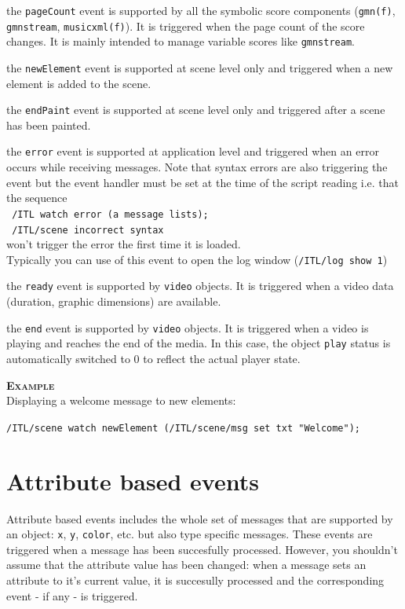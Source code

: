 \documentclass[a4paper,twoside]{report}
\newcommand{\sublevel}[1]	{\section{#1}}
\newcommand{\OSC}[1]		{\texttt{#1}}
\newcommand{\example}		{\textbf{\hspace{-1.5cm}\textbf{\textsc{Example }}}}
\let\olditemize\itemize
\let\oldenditemize\enditemize
\renewenvironment{itemize} 	{\olditemize \setlength{\itemsep}{1mm}}{\oldenditemize}
\newcommand{\sample}	[1]			{\vspace{-2mm}\begin{center}\colorbox{mygrey}{
								\begin{minipage}[t]{0.9\columnwidth} 
								{\small \texttt{#1}}
								\end{minipage}}\end{center}}
\begin{document}
\begin{itemize}
\item the \OSC{pageCount} event is supported by all the symbolic score components (\OSC{gmn(f)}, \OSC{gmnstream}, \OSC{musicxml(f)}). It is triggered when the page count of the score changes. It is mainly intended to manage variable scores like \OSC{gmnstream}.
\item the \OSC{newElement} event is supported at scene level only and triggered when a new element is added to the scene.
\item the \OSC{endPaint} event is supported at scene level only and triggered after a scene has been painted.
\item the \OSC{error} event is supported at application level and triggered when an error occurs while receiving messages. Note that syntax errors are also triggering the event but the event handler must be set at the time of the script reading i.e. that the sequence \\
\OSC{ /ITL watch error (a message lists);}\\
\OSC{ /ITL/scene incorrect syntax}\\
won't trigger the error the first time it is loaded. \\
Typically you can use of this event to open the log window (\OSC{/ITL/log show 1}) 
\item the \OSC{ready} event is supported by \OSC{video} objects. It is triggered when a video data (duration, graphic dimensions) are available.
\item the \OSC{end} event is supported by \OSC{video} objects. It is triggered when a video is playing and reaches the end of the media. In this case, the object \OSC{play} status is automatically switched to 0 to reflect the actual player state.
\end{itemize}

\example \\
Displaying a welcome message to new elements:
\sample{/ITL/scene watch newElement (/ITL/scene/msg set txt "Welcome");}

\sublevel{Attribute based events}
\label{attributeevents}

Attribute based events includes the whole set of messages that are supported by an object: \OSC{x}, \OSC{y}, \OSC{color}, etc. but also type specific messages. These events are triggered when a message has been succesfully processed. However, you shouldn't assume that the attribute value has been changed: when a message sets an attribute to it's current value, it is succesully processed and the corresponding event - if any - is triggered. 
\end{document}
